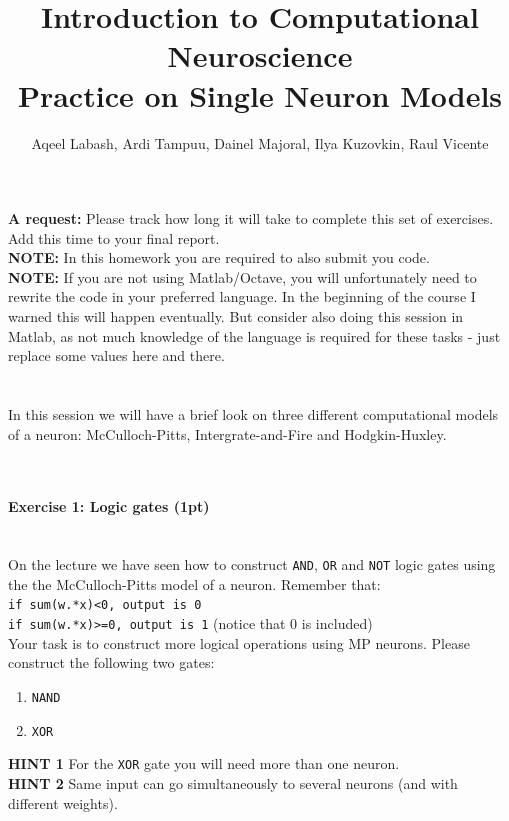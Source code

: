 \documentclass[a4paper,11pt]{article}
\author{\large{Aqeel Labash, Ardi Tampuu, Dainel Majoral, Ilya Kuzovkin, Raul Vicente}}
\title{\huge{Introduction to Computational Neuroscience}\\\LARGE{Practice on Single Neuron Models}}
\newenvironment{exercise}[3]{\paragraph{Exercise #1: #2 (#3pt)}\ \\}{
\medskip}
\begin{document}
\maketitle

\textbf{A request:} Please track how long it will take to complete this set of exercises. Add this time to your final report.
\ \\
\textbf{NOTE:} In this homework you are required to also submit you code.\\
\textbf{NOTE:} If you are not using Matlab/Octave, you will unfortunately need to rewrite the code in your preferred language. In the beginning of the course I warned this will happen eventually. But consider also doing this session in Matlab, as not much knowledge of the language is required for these tasks - just replace some values here and there.\\
\ \\
\ \\
%
%
In this session we will have a brief look on three different computational models of a neuron: McCulloch-Pitts, Intergrate-and-Fire and Hodgkin-Huxley.\

\ \\

%
%
\begin{exercise}{1}{Logic gates}{1}
On the lecture we have seen how to construct \texttt{AND}, \texttt{OR} and \texttt{NOT} logic gates using the the McCulloch-Pitts model of a neuron. Remember that:\\
 \texttt{if sum(w.*x)<0, output is 0}\\
 \texttt{if sum(w.*x)>=0, output is 1} (notice that 0 is included)\\
 Your task is to construct more logical operations using MP neurons. Please construct the following two gates:
\begin{enumerate}
\itemsep 0em
	\item \texttt{NAND}
	\item \texttt{XOR}
\end{enumerate}
\textbf{HINT 1} For the \texttt{XOR} gate you will need more than one neuron.\\
\textbf{HINT 2} Same input can go simultaneously to several neurons (and with different weights).
\end{exercise}
\end{document}
